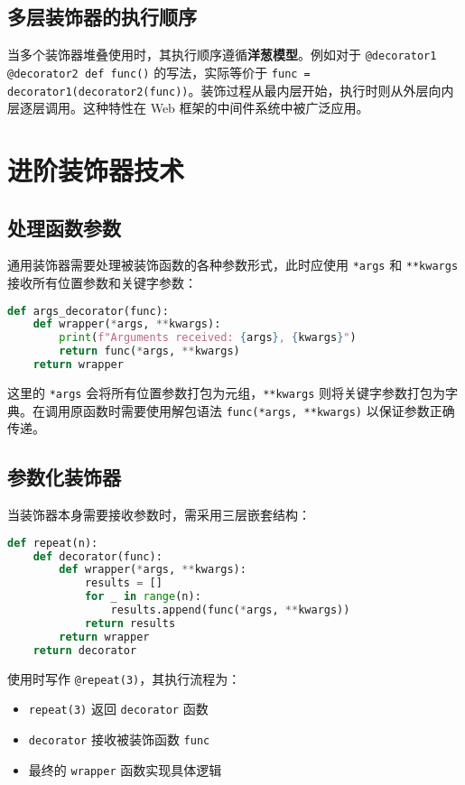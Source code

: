 \section{多层装饰器的执行顺序}
当多个装饰器堆叠使用时，其执行顺序遵循\textbf{洋葱模型}。例如对于 \verb!@decorator1 @decorator2 def func()! 的写法，实际等价于 \verb!func = decorator1(decorator2(func))!。装饰过程从最内层开始，执行时则从外层向内层逐层调用。这种特性在 Web 框架的中间件系统中被广泛应用。\par
\chapter{进阶装饰器技术}
\section{处理函数参数}
通用装饰器需要处理被装饰函数的各种参数形式，此时应使用 \verb!*args! 和 \verb!**kwargs! 接收所有位置参数和关键字参数：\par
\begin{lstlisting}[language=python]
def args_decorator(func):
    def wrapper(*args, **kwargs):
        print(f"Arguments received: {args}, {kwargs}")
        return func(*args, **kwargs)
    return wrapper
\end{lstlisting}
这里的 \verb!*args! 会将所有位置参数打包为元组，\verb!**kwargs! 则将关键字参数打包为字典。在调用原函数时需要使用解包语法 \verb!func(*args, **kwargs)! 以保证参数正确传递。\par
\section{参数化装饰器}
当装饰器本身需要接收参数时，需采用三层嵌套结构：\par
\begin{lstlisting}[language=python]
def repeat(n):
    def decorator(func):
        def wrapper(*args, **kwargs):
            results = []
            for _ in range(n):
                results.append(func(*args, **kwargs))
            return results
        return wrapper
    return decorator
\end{lstlisting}
使用时写作 \verb!@repeat(3)!，其执行流程为：\par
\begin{itemize}
\item \verb!repeat(3)! 返回 \verb!decorator! 函数
\item \verb!decorator! 接收被装饰函数 \verb!func!
\item 最终的 \verb!wrapper! 函数实现具体逻辑
\end{itemize}
